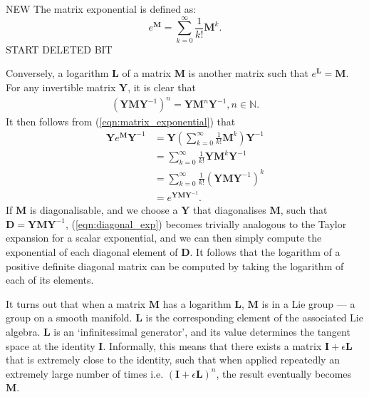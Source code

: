         NEW The matrix exponential is defined as:
        \begin{equation}
          e^{\mathbf{M}} = \sum_{k=0}^{\infty}\frac{1}{k!}\mathbf{M}^k. \label{eqn:matrix_exponential}
        \end{equation}
        START DELETED BIT

                Conversely, a logarithm $\mathbf{L}$ of a matrix $\mathbf{M}$ is another matrix such that $e^\mathbf{L} = \mathbf{M}$. For any invertible matrix $\mathbf{Y}$, it is clear that
                \begin{gather}
                    (\mathbf{YM}\mathbf{Y}^{-1})^n = \mathbf{Y}\mathbf{M}^n\mathbf{Y}^{-1}, n \in \mathbb{N}.
                \end{gather}
                It then follows from (\ref{eqn:matrix_exponential}) that
                \begin{align}
                    \mathbf{Y}e^{\mathbf{M}}\mathbf{Y}^{-1} &= \mathbf{Y}\left(\sum_{k=0}^{\infty}\frac{1}{k!}\mathbf{M}^k\right)\mathbf{Y}^{-1} \\
                                                            &= \sum_{k=0}^{\infty}\frac{1}{k!}\mathbf{Y}\mathbf{M}^k\mathbf{Y}^{-1} \\
                                                            &= \sum_{k=0}^{\infty}\frac{1}{k!}(\mathbf{YM}\mathbf{Y}^{-1})^k \label{eqn:diagonal_exp} \\
                                                            &= e^{\mathbf{YM}\mathbf{Y}^{-1}}.
                \end{align}
                If $\mathbf{M}$ is diagonalisable, and we choose a $\mathbf{Y}$ that diagonalises $\mathbf{M}$, such that $\mathbf{D} = \mathbf{YMY}^{-1}$, (\ref{eqn:diagonal_exp}) becomes trivially analogous to the Taylor expansion for a scalar exponential, and we can then simply compute the exponential of each diagonal element of $\mathbf{D}$. It follows that the logarithm of a positive definite diagonal matrix can be computed by taking the logarithm of each of its elements.
                
                It turns out that when a matrix $\mathbf{M}$ has a logarithm $\mathbf{L}$, $\mathbf{M}$ is in a Lie group --- a group on a smooth manifold. $\mathbf{L}$ is the corresponding element of the associated Lie algebra. $\mathbf{L}$ is an `infinitessimal generator', and its value determines the tangent space at the identity $\mathbf{I}$. Informally, this means that there exists a matrix $\mathbf{I} + \epsilon \mathbf{L}$ that is extremely close to the identity, such that when applied repeatedly an extremely large number of times i.e. $(\mathbf{I} + \epsilon \mathbf{L})^n$, the result eventually becomes $\mathbf{M}$.
        

